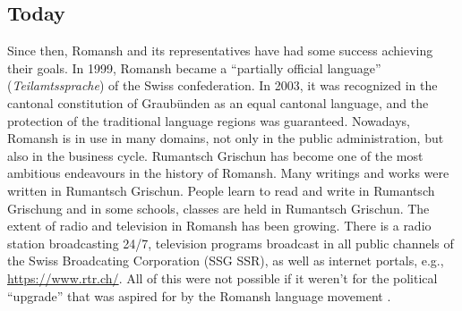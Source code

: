 \subsection{Today}
Since then, Romansh and its representatives have had some success achieving their goals. 
In 1999, Romansh became a \enquote{partially official language} (\emph{Teilamtssprache}) of the Swiss confederation. 
In 2003, it was recognized in the cantonal constitution of Graubünden as an equal cantonal language, and the protection of the traditional language regions was guaranteed.
Nowadays, Romansh is in use in many domains, not only in the public administration, but also in the business cycle. 
Rumantsch Grischun has become one of the most ambitious endeavours in the history of Romansh. 
Many writings and works were written in Rumantsch Grischun. 
People learn to read and write in Rumantsch Grischung and in some schools, classes are held in Rumantsch Grischun. 
The extent of radio and television in Romansh has been growing. 
There is a radio station broadcasting 24/7, television programs broadcast in all public channels of the Swiss Broadcating Corporation (SSG SSR), as well as  internet portals, e.g., \url{https://www.rtr.ch/}. All of this were not possible if it weren't for the political \enquote{upgrade} that was aspired for by the Romansh language movement \autocite{cathomas2012}.






